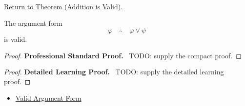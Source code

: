 \newpage
{}
\label{prf:addition-validity-propositional-logic}

\begin{remark*}[Return]
\hyperref[thm:addition-validity-propositional-logic]{Return to Theorem (Addition is Valid).}
\end{remark*}

\begin{theorem*}
The argument form
\[
\varphi \quad\therefore\quad \varphi\lor\psi
\]
is valid.
\end{theorem*}

\begin{proof}
\textbf{Professional Standard Proof.}~
TODO: supply the compact proof.
\end{proof}

\begin{proof}
\textbf{Detailed Learning Proof.}~
TODO: supply the detailed learning proof.
\end{proof}

\begin{remark*}
\end{remark*}

\begin{dependencies}
\begin{itemize}
  \item \hyperref[def:valid-argument-form-propositional-logic]{Valid Argument Form}
\end{itemize}
\end{dependencies}

\clearpage
